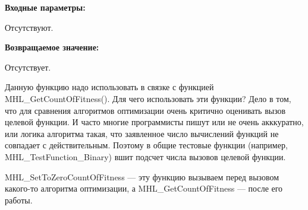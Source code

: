 \textbf{Входные параметры:}

Отсутствуют.

\textbf{Возвращаемое значение:}
 
Отсутствует.

Данную функцию надо использовать в связке с функцией MHL\_GetCountOfFitness(). Для чего использовать эти функции? Дело в том, что для сравнения алгоритмов оптимизации очень критично оценивать вызов целевой функции. И часто многие программисты пишут или не очень акккуратно, или логика алгоритма такая, что заявленное число вычислений функций не совпадает с действительным. Поэтому в общие тестовые функции (например, MHL\_TestFunction\_Binary) вшит подсчет числа вызовов целевой функции.

MHL\_SetToZeroCountOfFitness --- эту функцию вызываем перед вызовом какого-то алгоритма оптимизации, а MHL\_GetCountOfFitness --- после его работы.